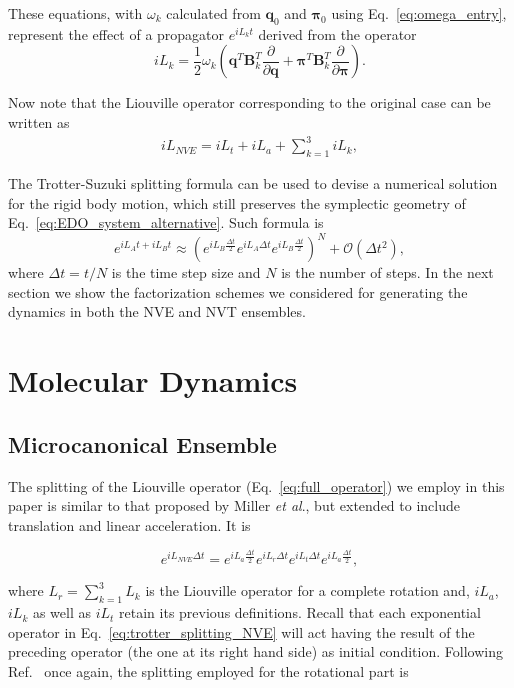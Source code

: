 \documentclass[aip,jcp,reprint,amsmath,amssymb]{revtex4-1}
\newcommand{\mt}[1]{\boldsymbol{\mathbf{#1}}}           %
\newcommand{\vt}[1]{\boldsymbol{\mathbf{#1}}}           %
\newcommand{\tr}[1]{#1^T}                               %
\newcommand{\diff}[2]{\dfrac{\partial #1}{\partial #2}} %
\begin{document}
These equations, with $\omega_k$ calculated from $\vt q_0$ and $\vt \pi_0$ using Eq.~\ref{eq:omega_entry}, represent the effect of a propagator $e^{i L_k t}$ derived from the operator
\[
i L_k = \frac{1}{2} \omega_k \left( \tr{\vt q}\tr{{\mt B}_k} \diff{}{\vt q} + \tr{\vt \pi}\tr{{\mt B}_k} \diff{}{\vt \pi} \right).
\]

Now note that the Liouville operator corresponding to the original case can be written as
\begin{align}
\label{eq:full_operator}
i L_{NVE} = i L_t + i L_a + \sum_{k=1}^3 i L_k,
\end{align}

The Trotter-Suzuki splitting formula\cite{Trotter1959, Suzuki1976} can be used to devise a numerical solution for the rigid body motion, which still preserves the symplectic geometry of Eq.~\ref{eq:EDO_system_alternative}. Such formula is
\[
e^{i L_A t + i L_B t} \approx \left( e^{i L_B \frac{\Delta t}{2}} e^{i L_A \Delta t} e^{i L_B \frac{\Delta t}{2}} \right)^N + \mathcal{O}(\Delta t^2),
\]
where $\Delta t = t/N$ is the time step size and $N$ is the number of steps. In the next section we show the factorization schemes we considered for generating the dynamics in both the NVE and NVT ensembles.

\section{Molecular Dynamics}
\label{sec:moleculardynamics}

\subsection{Microcanonical Ensemble}

The splitting of the Liouville operator (Eq.~\ref{eq:full_operator}) we employ in this paper is similar to that proposed by Miller \textit{et al}.\cite{Miller2002}, but extended to include translation and linear acceleration. It is

\begin{equation}
\label{eq:trotter_splitting_NVE}
e^{i L_{NVE} \Delta t} = e^{i L_a \frac{\Delta t}{2}} e^{i L_r \Delta t} e^{i L_t \Delta t} e^{i L_a \frac{\Delta t}{2}},
\end{equation}

where $L_r = \sum_{k=1}^3 L_k$ is the Liouville operator for a complete rotation and, $i L_a $, $i L_k $ as well as $i L_t $ retain its previous definitions. Recall that each exponential operator in Eq.~\ref{eq:trotter_splitting_NVE} will act having the result of the preceding operator (the one at its right hand side) as initial condition. Following Ref.~ once again, the splitting employed for the rotational part is
\end{document}

